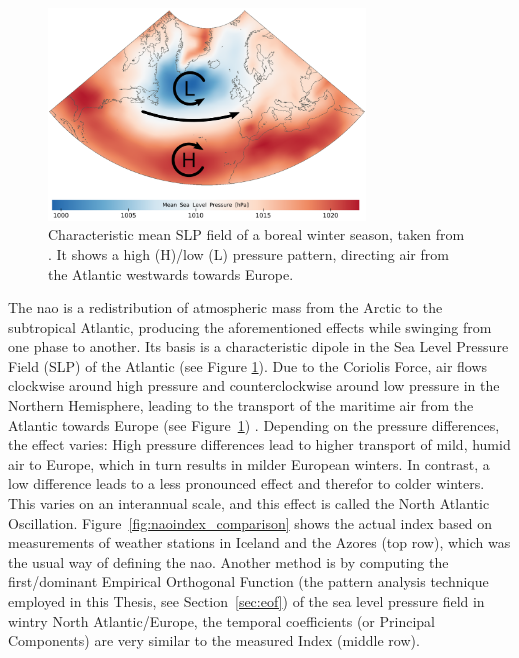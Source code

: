 \begin{figure}[htb]
  \begin{center}
    \includegraphics[width=0.75\textwidth]{figures/nao_pattern_diss.png}
  \end{center}
  \caption{Characteristic mean SLP field of a boreal winter season, taken from \cite{vietinghoffdiss}. It shows a high (H)/low (L) pressure pattern, directing air from the Atlantic westwards towards Europe. }
  \label{fig:naopattern}
\end{figure}


The \ac{nao} is a redistribution of atmospheric mass from the Arctic to the subtropical Atlantic, producing the aforementioned effects while swinging from one phase to another. 
Its basis is a characteristic dipole in the Sea Level Pressure Field (SLP) of the Atlantic (see Figure \ref{fig:naopattern}).
Due to the Coriolis Force, air flows clockwise around high pressure and counterclockwise around low pressure in the Northern Hemisphere, leading to the transport of the maritime air from the Atlantic towards Europe (see Figure~\ref{fig:naopattern}) \cite{hurrell_overview_2003, vietinghoffdiss}. 
Depending on the pressure differences, the effect varies: High pressure differences lead to higher transport of mild, humid air to Europe, which in turn results in milder European winters. In contrast, a low difference leads to a less pronounced effect and therefor to colder winters. 
This varies on an interannual scale, and this effect is called the North Atlantic Oscillation. 
Figure~\ref{fig:naoindex_comparison} shows the actual index based on measurements of weather stations in Iceland and the Azores (top row), which was the usual way of defining the \ac{nao}. 
Another method is by computing the first/dominant Empirical Orthogonal Function (the pattern analysis technique employed in this Thesis, see Section~\ref{sec:eof}) of the sea level pressure field in wintry North Atlantic/Europe, the temporal coefficients (or Principal Components) are very similar to the measured Index (middle row). 

